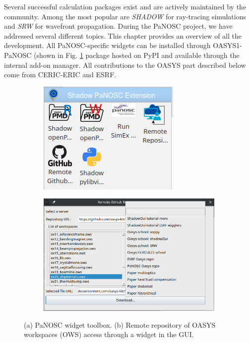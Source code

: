 \documentclass[11pt, a4paper]{article}
\begin{document}
Several successful calculation packages exist and are actively maintained by the community. Among the most popular are \emph{SHADOW} for ray-tracing simulations and \emph{SRW} for wavefront propagation. During the PaNOSC project, we have addressed several different topics. This chapter provides an overview of all the development. All PaNOSC-specific widgets can be installed through OASYS1-PaNOSC (shown in Fig. \ref{fig:toolbox} package hosted on PyPI and available through the internal add-on manager. All contributions to the OASYS part described below come from CERIC-ERIC and ESRF.

\begin{figure}[htb]
    \centering
    \begin{subfigure}{0.3\textwidth}
        \includegraphics{figures/panosc_toolbox.png}
        \caption{}
        \label{fig:toolbox}
    \end{subfigure}
    \hfil
    \begin{subfigure}{0.5\textwidth}
        \includegraphics{figures/github_remote_access.png}
        \caption{}
        \label{fig:github_access}
    \end{subfigure}%
    \caption{(a) PaNOSC widget toolbox. (b) Remote repository of OASYS workspaces (OWS) access through a widget in the GUI.}
\end{figure}
\end{document}
